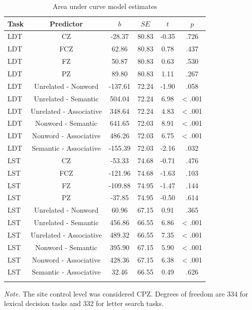 \documentclass[english,man]{apa6}
\theoremstyle{definition}
\theoremstyle{definition}
\theoremstyle{definition}
\theoremstyle{remark}
\begin{document}
\begin{table}[tbp]
\begin{center}
\begin{threeparttable}
\caption{\label{tab:area-table-est}Area under curve model estimates}
\begin{tabular}{lccccc}
\toprule
Task & Predictor & $b$ & $SE$ & $t$ & $p$\\
\midrule
LDT & CZ & -28.37 & 80.83 & -0.35 & .726\\
LDT & FCZ & 62.86 & 80.83 & 0.78 & .437\\
LDT & FZ & 50.87 & 80.83 & 0.63 & .530\\
LDT & PZ & 89.80 & 80.83 & 1.11 & .267\\
LDT & Unrelated - Nonword & -137.61 & 72.24 & -1.90 & .058\\
LDT & Unrelated - Semantic & 504.04 & 72.24 & 6.98 & < .001\\
LDT & Unrelated - Associative & 348.64 & 72.24 & 4.83 & < .001\\
LDT & Nonword - Semantic & 641.65 & 72.03 & 8.91 & < .001\\
LDT & Nonword - Associative & 486.26 & 72.03 & 6.75 & < .001\\
LDT & Semantic - Associative & -155.39 & 72.03 & -2.16 & .032\\
LST & CZ & -53.33 & 74.68 & -0.71 & .476\\
LST & FCZ & -121.96 & 74.68 & -1.63 & .103\\
LST & FZ & -109.88 & 74.95 & -1.47 & .144\\
LST & PZ & -37.85 & 74.95 & -0.50 & .614\\
LST & Unrelated - Nonword & 60.96 & 67.15 & 0.91 & .365\\
LST & Unrelated - Semantic & 456.86 & 66.55 & 6.86 & < .001\\
LST & Unrelated - Associative & 489.32 & 66.55 & 7.35 & < .001\\
LST & Nonword - Semantic & 395.90 & 67.15 & 5.90 & < .001\\
LST & Nonword - Associative & 428.36 & 67.15 & 6.38 & < .001\\
LST & Semantic - Associative & 32.46 & 66.55 & 0.49 & .626\\
\bottomrule
\addlinespace
\end{tabular}
\begin{tablenotes}[para]
\textit{Note.} The site control level was considered CPZ. Degrees of freedom are 334 for lexical decision tasks and 332 for letter search tasks.
\end{tablenotes}
\end{threeparttable}
\end{center}
\end{table}
\end{document}
